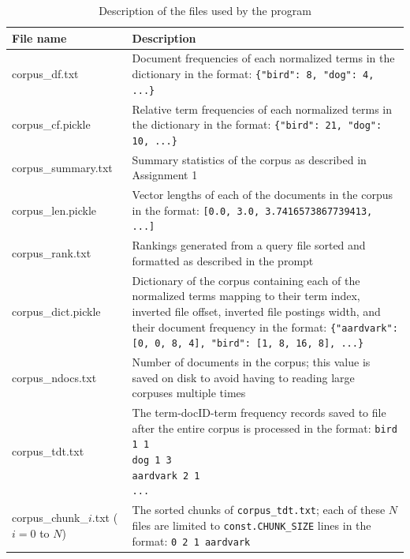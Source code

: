 \documentclass[11pt]{article}
\begin{document}
\begin{table}[!ht]
    \caption{Description of the files used by the program}
    \begin{center} \label{files}
        
        \begin{tabular}{| L{3.5cm} | L{12cm} |}
        \hline
        \textbf{File name} & \textbf{Description}
        \\ \hline
        corpus\_df.txt & Document frequencies of each normalized terms in the dictionary in the format: \newline \texttt{\{"bird": 8, "dog": 4, ...\}}
        \\ \hline
        corpus\_cf.pickle & Relative term frequencies of each normalized terms in the dictionary in the format: \newline \texttt{\{"bird": 21, "dog": 10, ...\}}
        \\ \hline
        corpus\_summary.txt & Summary statistics of the corpus as described in Assignment 1
        \\ \hline
        corpus\_len.pickle & Vector lengths of each of the documents in the corpus in the format: \newline \texttt{{[0.0, 3.0, 3.7416573867739413, ...]}}
        \\ \hline
        corpus\_rank.txt & Rankings generated from a query file sorted and formatted as described in the prompt
        \\ \hline
        corpus\_dict.pickle & Dictionary of the corpus containing each of the normalized terms mapping to their term index, inverted file offset, inverted file postings width, and their document frequency in the format: \newline \texttt{\{"aardvark": [0, 0, 8, 4], "bird": [1, 8, 16, 8], ...\}}
        \\ \hline
        corpus\_ndocs.txt & Number of documents in the corpus; this value is saved on disk to avoid having to reading large corpuses multiple times
        \\ \hline
        corpus\_tdt.txt & The term-docID-term frequency records saved to file after the entire corpus is processed in the format: \newline \texttt{bird 1 1 \newline
        dog 1 3 \newline
        aardvark 2 1 \newline
        ...}
        \\ \hline
        corpus\_chunk\_$i$.txt ($i=0$ to $N$) & The sorted chunks of \texttt{corpus\_tdt.txt}; each of these  $N$ files are limited to \texttt{const.CHUNK\_SIZE} lines in the format: \newline \texttt{0 2 1 aardvark \newline
}
\end{tabular}
\end{center}
\end{table}
\end{document}
